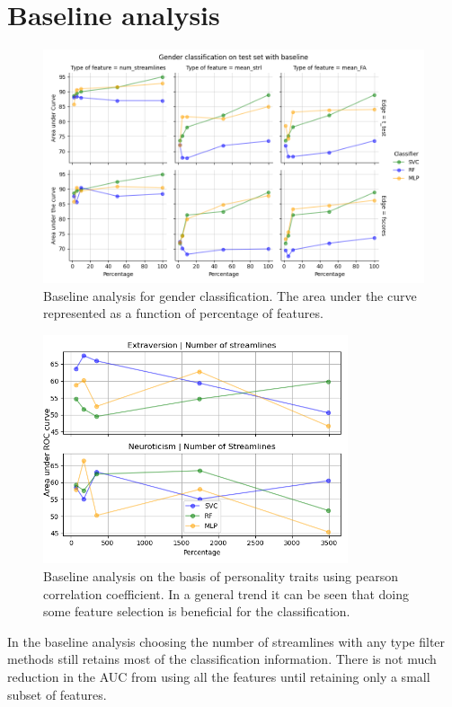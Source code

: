 \documentclass[msthesis.tex]{subfiles}
\begin{document}
\section{Baseline analysis}
\begin{figure}
    \centering
    \includegraphics[width=\textwidth]{images/baseline_results_gender.png}
    \caption{Baseline analysis for gender classification. The area under the curve represented as a function of percentage of features. }
    \label{fig:my_label}
\end{figure}
\begin{figure}
    \centering
    \includegraphics[width=0.8\textwidth]{images/persona_2.png}
    \caption{Baseline analysis on the basis of personality traits using pearson correlation coefficient. In a general trend it can be seen that doing some feature selection is beneficial for the classification.}
    \label{fig:persona base}
\end{figure}
In the baseline analysis choosing the number of streamlines with any type filter methods still retains most of the classification information. There is not much reduction in the AUC from using all the features until retaining only a small subset of features.
\end{document}
